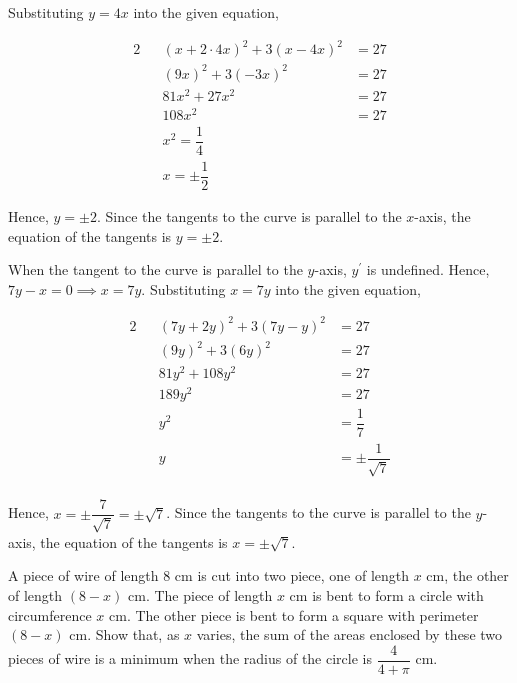 \documentclass{echw}
\begin{document}
                Substituting $y=4x$ into the given equation,

                \begin{alignat*}{2}
                    &&(x+2 \cdot 4x)^2 + 3(x-4x)^2 &= 27\\
                    &&(9x)^2 + 3(-3x)^2 &= 27\\
                    &&81x^2 + 27x^2 &= 27\\
                    &&108x^2 &= 27\\
                    &&x^2 = \dfrac14\\
                    &&x = \pm \dfrac12
                \end{alignat*}

                Hence, $y = \pm 2$. Since the tangents to the curve is parallel to the $x$-axis, the equation of the tangents is $y = \pm 2$.


            \subpart
                When the tangent to the curve is parallel to the $y$-axis, $y^\prime$ is undefined. Hence, $7y-x =0 \implies x = 7y$. Substituting $x = 7y$ into the given equation,

                \begin{alignat*}{2}
                    &&(7y+2y)^2 + 3(7y-y)^2 &= 27\\
                    &&(9y)^2 + 3(6y)^2 &= 27\\
                    &&81y^2 + 108y^2 &= 27\\
                    &&189y^2 &= 27\\
                    &&y^2 &= \dfrac17\\
                    &&y &= \pm \dfrac1{\sqrt7}\\
                \end{alignat*}

                Hence, $x = \pm \dfrac{7}{\sqrt7} = \pm \sqrt7$. Since the tangents to the curve is parallel to the $y$-axis, the equation of the tangents is $x = \pm \sqrt7$.


    \problem{}
        A piece of wire of length 8 cm is cut into two piece, one of length $x$ cm, the other of length $(8-x)$ cm. The piece of length $x$ cm is bent to form a circle with circumference $x$ cm. The other piece is bent to form a square with perimeter $(8-x)$ cm. Show that, as $x$ varies, the sum of the areas enclosed by these two pieces of wire is a minimum when the radius of the circle is $\dfrac4{4+\pi}$ cm.
\end{document}
